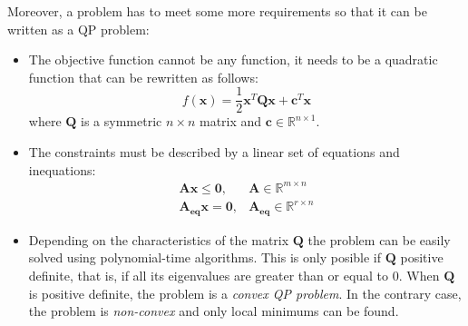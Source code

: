 Moreover, a problem has to meet some more requirements so that it can be written as a QP problem:

\begin{itemize}
    \item The objective function cannot be any function, it needs to be a quadratic function that can be rewritten as follows:
    $$
    f(\mathbf{x}) = \frac{1}{2} \mathbf{x}^{T} \mathbf{Q} \mathbf{x}+\mathbf{c}^{T} \mathbf{x}
    $$
    where $\mathbf{Q}$ is a symmetric $n \times n$ matrix and $\mathbf{c} \in \mathbb{R}^{n \times 1}$.
    \item The constraints must be described by a linear set of equations and inequations:
    $$
    \begin{array}{ll}
        \mathbf{A} \mathbf{x} \leq \mathbf{0}, & \mathbf{A} \in \mathbb{R}^{m \times n} \\
        \mathbf{A_{eq}} \mathbf{x} = \mathbf{0}, & \mathbf{A_{eq}} \in \mathbb{R}^{r \times n}
    \end{array}
    $$
    \item Depending on the characteristics of the matrix $\mathbf{Q}$ the problem can be easily solved using polynomial-time algorithms. This is only posible if $\mathbf{Q}$ positive definite, that is, if all its eigenvalues are greater than or equal to $0$. When $\mathbf{Q}$ is positive definite, the problem is a \textit{convex QP problem}. In the contrary case, the problem is \textit{non-convex} and only local minimums can be found.
\end{itemize}